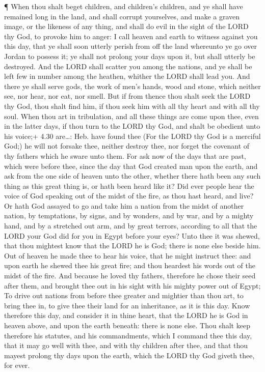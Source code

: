  ¶ When thou shalt beget children, and children's children,
and ye shall have remained long in the land, and shall corrupt
yourselves, and make a graven image, or the likeness of any thing, and
shall do evil in the sight of the LORD thy God, to provoke him to anger:
 I call heaven and earth to witness against you this day,
that ye shall soon utterly perish from off the land whereunto ye go over
Jordan to possess it; ye shall not prolong your days upon it, but shall
utterly be destroyed.  And the LORD shall scatter you among
the nations, and ye shall be left few in number among the heathen,
whither the LORD shall lead you.  And there ye shall serve
gods, the work of men's hands, wood and stone, which neither see, nor
hear, nor eat, nor smell.  But if from thence thou shalt
seek the LORD thy God, thou shalt find him, if thou seek him with all
thy heart and with all thy soul.  When thou art in
tribulation, and all these things are come upon thee, even in the latter
days, if thou turn to the LORD thy God, and shalt be obedient unto his
voice;+ 4.30 are\ldots: Heb. have found thee  (For the LORD
thy God is a merciful God;) he will not forsake thee, neither destroy
thee, nor forget the covenant of thy fathers which he sware unto them.
 For ask now of the days that are past, which were before
thee, since the day that God created man upon the earth, and ask from
the one side of heaven unto the other, whether there hath been any such
thing as this great thing is, or hath been heard like it? 
Did ever people hear the voice of God speaking out of the midst of the
fire, as thou hast heard, and live?  Or hath God assayed to
go and take him a nation from the midst of another nation, by
temptations, by signs, and by wonders, and by war, and by a mighty hand,
and by a stretched out arm, and by great terrors, according to all that
the LORD your God did for you in Egypt before your eyes? 
Unto thee it was shewed, that thou mightest know that the LORD he is
God; there is none else beside him.  Out of heaven he made
thee to hear his voice, that he might instruct thee: and upon earth he
shewed thee his great fire; and thou heardest his words out of the midst
of the fire.  And because he loved thy fathers, therefore
he chose their seed after them, and brought thee out in his sight with
his mighty power out of Egypt;  To drive out nations from
before thee greater and mightier than thou art, to bring thee in, to
give thee their land for an inheritance, as it is this day.
 Know therefore this day, and consider it in thine heart,
that the LORD he is God in heaven above, and upon the earth beneath:
there is none else.  Thou shalt keep therefore his
statutes, and his commandments, which I command thee this day, that it
may go well with thee, and with thy children after thee, and that thou
mayest prolong thy days upon the earth, which the LORD thy God giveth
thee, for ever.

